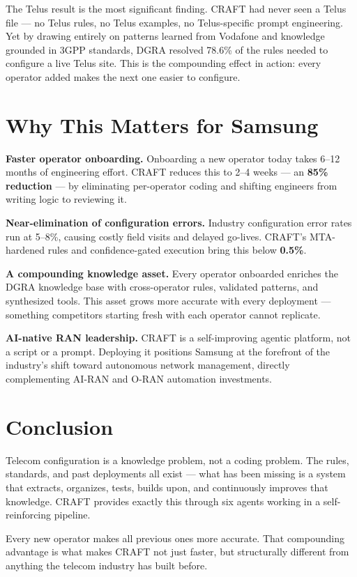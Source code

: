 \documentclass[10.5pt]{article}
\begin{document}
The Telus result is the most significant finding. CRAFT had never seen a Telus file --- no Telus rules, no Telus examples, no Telus-specific prompt engineering. Yet by drawing entirely on patterns learned from Vodafone and knowledge grounded in 3GPP standards, DGRA resolved 78.6\% of the rules needed to configure a live Telus site. This is the compounding effect in action: every operator added makes the next one easier to configure.

\section{Why This Matters for Samsung}

\textbf{Faster operator onboarding.} Onboarding a new operator today takes 6--12 months of engineering effort. CRAFT reduces this to 2--4 weeks --- an \textbf{85\% reduction} --- by eliminating per-operator coding and shifting engineers from writing logic to reviewing it.

\textbf{Near-elimination of configuration errors.} Industry configuration error rates run at 5--8\%, causing costly field visits and delayed go-lives. CRAFT's MTA-hardened rules and confidence-gated execution bring this below \textbf{0.5\%}.

\textbf{A compounding knowledge asset.} Every operator onboarded enriches the DGRA knowledge base with cross-operator rules, validated patterns, and synthesized tools. This asset grows more accurate with every deployment --- something competitors starting fresh with each operator cannot replicate.

\textbf{AI-native RAN leadership.} CRAFT is a self-improving agentic platform, not a script or a prompt. Deploying it positions Samsung at the forefront of the industry's shift toward autonomous network management, directly complementing AI-RAN and O-RAN automation investments.

\section{Conclusion}

Telecom configuration is a knowledge problem, not a coding problem. The rules, standards, and past deployments all exist --- what has been missing is a system that extracts, organizes, tests, builds upon, and continuously improves that knowledge. CRAFT provides exactly this through six agents working in a self-reinforcing pipeline.

Every new operator makes all previous ones more accurate. That compounding advantage is what makes CRAFT not just faster, but structurally different from anything the telecom industry has built before.
\end{document}
